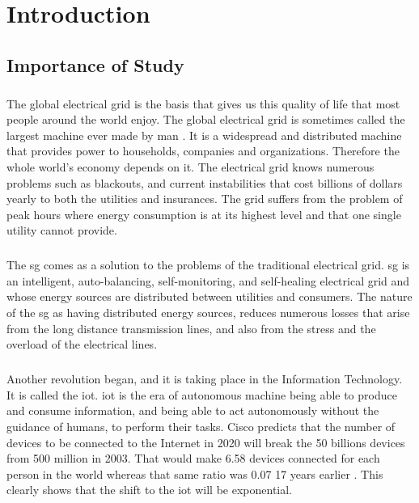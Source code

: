 \documentclass[oneside,12pt,a4paper,final]{book}
\begin{document}
\tableofcontents
\listoffigures
\listoftables
\printglossaries

\mainmatter
\doublespacing
\chapter{Introduction}

\section{Importance of Study}
\paragraph{}
The global electrical grid is the basis that gives us this quality of life that most people around the world enjoy. The global electrical grid is sometimes called the largest machine ever made by man \cite{ref1}. It is a widespread and distributed machine that provides power to households, companies and organizations. Therefore the whole world's economy depends on it. The electrical grid knows numerous problems such as blackouts, and current instabilities that cost billions of dollars yearly to both the utilities and insurances. The grid suffers from the problem of peak hours where energy consumption is at its highest level and that one single utility cannot provide.
\paragraph{}
The \gls{sg} comes as a solution to the problems of the traditional electrical grid. \gls{sg} is an intelligent, auto-balancing, self-monitoring, and self-healing electrical grid \cite{ref2} and whose energy sources are distributed between utilities and consumers. The nature of the \gls{sg} as having distributed energy sources, reduces numerous losses that arise from the long distance transmission lines, and also from the stress and the overload of the electrical lines.
\paragraph{}
Another revolution began, and it is taking place in the Information Technology. It is called the \gls{iot}. \gls{iot} is the era of autonomous machine being able to produce and consume information, and being able to act autonomously without the guidance of humans, to perform their tasks. Cisco predicts that the number of devices to be connected to the Internet in 2020 will break the 50 billions devices from 500 million in 2003. That would make 6.58 devices connected for each person in the world whereas that same ratio was 0.07 17 years earlier \cite{ref3}. This clearly shows that the shift to the \gls{iot} will be exponential.
\end{document}
